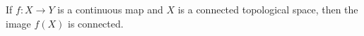 If $f \colon X \to Y$ is a continuous map and $X$ is a connected topological space, then the image $f(X)$ is connected.
